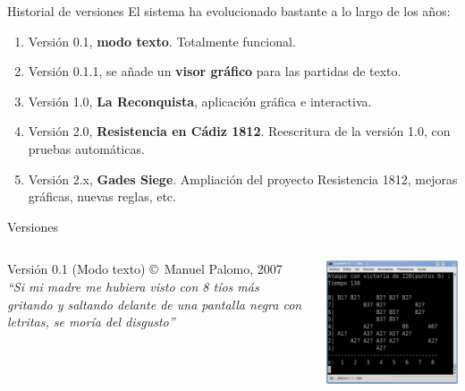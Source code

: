 \documentclass[smaller,spanish,xcolor=svgnames]{beamer}
\begin{document}
\begin{frame}{Historial de versiones}
  El sistema ha evolucionado bastante a lo largo de los años:
  \begin{enumerate}
  \item Versión 0.1, \textbf{modo texto}. Totalmente funcional.
  \item Versión 0.1.1, se añade un \textbf{visor gráfico} para las partidas de texto.
  \item Versión 1.0, \textbf{La Reconquista}, aplicación gráfica e interactiva.
  \item Versión 2.0, \textbf{Resistencia en Cádiz 1812}. Reescritura de la versión 1.0, con
    pruebas automáticas.
  \item Versión 2.x, \textbf{Gades Siege}. Ampliación del proyecto Resistencia 1812,
    mejoras gráficas, nuevas reglas, etc.
  \end{enumerate}  
\end{frame}

\begin{frame}{Versiones}
  \begin{columns}
    \begin{block}{Versión 0.1 (Modo texto)}
      \copyright \, Manuel Palomo, 2007\\
      \textit{``Si mi madre me hubiera visto con 8 tíos más gritando y saltando delante de una pantalla negra con letritas, se moría del disgusto''}
    \end{block}
    \includegraphics[width=\textwidth]{img/version_1}
  \end{columns}  
\end{frame}
\end{document}
